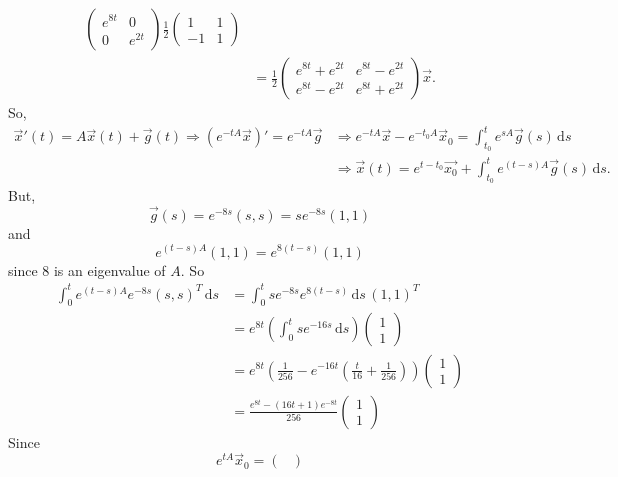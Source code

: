 \documentclass{exam}
\begin{document}
\begin{solution}
\begin{align*}
\begin{pmatrix}
            e^{8t} & 0 \\
            0 & e^{2t}
        \end{pmatrix}
        \frac{1}{2}
        \begin{pmatrix}
            1 & 1 \\
            -1 & 1
        \end{pmatrix}\\
        &= \frac{1}{2}\begin{pmatrix}
            e^{8t} + e^{2t} & e^{8t} - e^{2t} \\
            e^{8t} - e^{2t} & e^{8t} + e^{2t}
        \end{pmatrix}\vec{x}.
    \end{align*}
    So, 
    \begin{align*}
        \vec{x}'(t) = A\vec{x}(t) + \vec{g}(t) \Rightarrow (e^{-tA}\vec{x})' = e^{-tA}\vec{g} &\Rightarrow e^{-tA}\vec{x} - e^{-t_0 A}\vec{x}_0 = \int_{t_0}^{t}e^{sA}\vec{g}(s)\,\mathrm{d}s \\
        &\Rightarrow \vec{x}(t) = e^{t - t_0}\vec{x_0} + \int_{t_0}^{t}e^{(t-s)A}\vec{g}(s)\,\mathrm{d}s.
    \end{align*}
    But, 
    \[
        \vec{g}(s) = e^{-8s}(s, s) = se^{-8s}(1, 1) 
    \]
    and 
    \[
        e^{(t-s)A}(1, 1) = e^{8(t-s)}(1, 1)
    \]
    since $8$ is an eigenvalue of $A$. So 
    \begin{align*}
        \int_{0}^{t} e^{(t-s)A}e^{-8s}(s, s)^{T}\,\mathrm{d}s &= \int_{0}^{t}se^{-8s}e^{8(t-s)}\,\mathrm{d}s \,(1, 1)^{T} \\
        &= e^{8t}\left(\int_{0}^{t}se^{-16s}\,\mathrm{d}s\right)\begin{pmatrix}
            1 \\ 1
        \end{pmatrix} \\
        &= e^{8t}\left(\frac{1}{256} - e^{-16t}\left(\frac{t}{16} + \frac{1}{256}\right)\right)\begin{pmatrix}
            1 \\ 1
        \end{pmatrix}\\ 
        &= \frac{e^{8t} - (16t + 1)e^{-8t}}{256}\begin{pmatrix}
            1 \\ 1
        \end{pmatrix}
    \end{align*}
    Since 
    \[
        e^{tA}{\vec{x}_0}  = \begin{pmatrix}

\end{pmatrix}\]
\end{solution}
\end{document}
